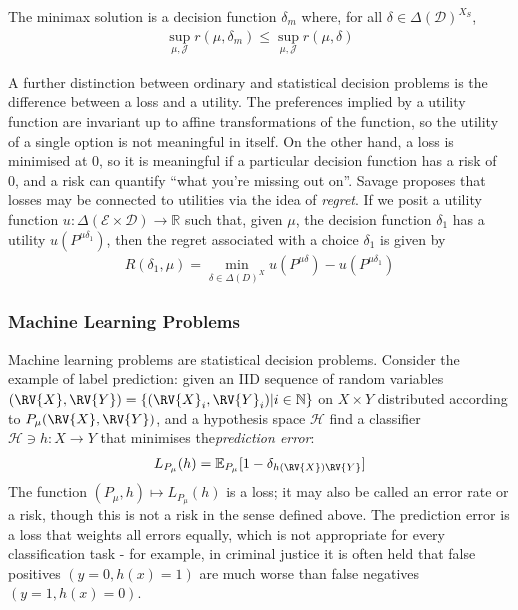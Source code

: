 The minimax solution is a decision function $\delta_m$ where, for all $\delta\in \Delta(\mathcal{D})^{X_S}$,
\begin{align}
    \sup_{\mu,\mathcal{J}} r(\mu,\delta_m) \leq \sup_{\mu,\mathcal{J}} r(\mu,\delta)
\end{align}

A further distinction between ordinary and statistical decision problems is the difference between a loss and a utility. The preferences implied by a utility function are invariant up to affine transformations of the function\cite{von_neumann_theory_1944}, so the utility of a single option is not meaningful in itself. On the other hand, a loss is minimised at 0, so it is meaningful if a particular decision function has a risk of 0, and a risk can quantify ``what you're missing out on''. Savage proposes that losses may be connected to utilities via the idea of \emph{regret}\cite{savage_theory_1951}. If we posit a utility function $u:\Delta(\mathcal{E}\times \mathcal{D})\to \mathbb{R}$ such that, given $\mu$, the decision function $\delta_1$ has a utility $u(P^{\mu\delta_1})$, then the regret associated with a choice $\delta_1$ is given by
\begin{align}
    R(\delta_1,\mu) = \min_{\delta\in \Delta(D)^X} u(P^{\mu\delta}) - u(P^{\mu\delta_1})
\end{align}



\subsubsection{Machine Learning Problems}\label{sec:ML_problems}

Machine learning problems are statistical decision problems. Consider the example of label prediction: given an IID sequence of random variables $(\RV{X},\RV{Y})=\{(\RV{X}_i,\RV{Y}_i)|i\in \mathbb{N}\}$ on $X\times Y$ distributed according to $P_\mu(\RV{X},\RV{Y})$, and a hypothesis space $\mathcal{H}$ find a classifier $\mathcal{H}\ni h:X\to Y$ that minimises the\emph{prediction error}\cite{shalev-shwartz_understanding_2014}:
\begin{align}
    L_{P_\mu}(h) = \mathbb{E}_{P_\mu}[1-\delta_{h(\RV{X})\RV{Y}}] \label{eq:prediction_loss}
\end{align}
The function $(P_\mu,h)\mapsto L_{P_\mu}(h)$ is a loss; it may also be called an error rate or a risk, though this is not a risk in the sense defined above. The prediction error is a loss that weights all errors equally, which is not appropriate for every classification task - for example, in criminal justice it is often held that false positives $(y=0,h(x)=1)$ are much worse than false negatives $(y=1,h(x)=0)$. 

